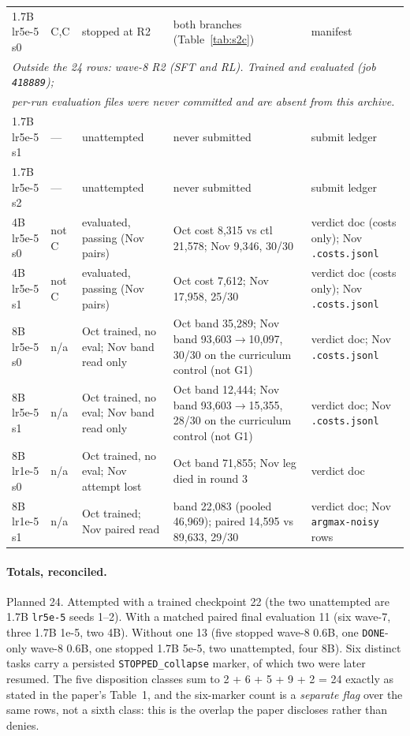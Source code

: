 \documentclass[11pt,a4paper]{article}
\begin{document}
\begin{table}[h]
\begin{tabular}{@{}p{2.35cm}p{2.0cm}p{2.6cm}p{3.5cm}p{3.2cm}@{}}
1.7B lr5e-5 s0 & C,C & stopped at R2 & both branches (Table~\ref{tab:s2c}) & manifest \\
\multicolumn{5}{l}{\emph{Outside the 24 rows: wave-8 R2 (SFT and RL). Trained and evaluated (job \texttt{418889});}} \\
\multicolumn{5}{l}{\emph{per-run evaluation files were never committed and are absent from this archive.}} \\
1.7B lr5e-5 s1 & --- & unattempted & never submitted & submit ledger \\
1.7B lr5e-5 s2 & --- & unattempted & never submitted & submit ledger \\
\midrule
4B lr5e-5 s0 & not C & evaluated, passing (Nov pairs) & Oct cost 8{,}315 vs ctl 21{,}578; Nov 9{,}346, 30/30 & verdict doc (costs only); Nov \texttt{.costs.jsonl} \\
4B lr5e-5 s1 & not C & evaluated, passing (Nov pairs) & Oct cost 7{,}612; Nov 17{,}958, 25/30 & verdict doc (costs only); Nov \texttt{.costs.jsonl} \\
\midrule
8B lr5e-5 s0 & n/a & Oct trained, no eval; Nov band read only & Oct band 35{,}289; Nov band 93{,}603$\to$10{,}097, 30/30 on the curriculum control (not G1) & verdict doc; Nov \texttt{.costs.jsonl} \\
8B lr5e-5 s1 & n/a & Oct trained, no eval; Nov band read only & Oct band 12{,}444; Nov band 93{,}603$\to$15{,}355, 28/30 on the curriculum control (not G1) & verdict doc; Nov \texttt{.costs.jsonl} \\
8B lr1e-5 s0 & n/a & Oct trained, no eval; Nov attempt lost & Oct band 71{,}855; Nov leg died in round 3 & verdict doc \\
8B lr1e-5 s1 & n/a & Oct trained; Nov paired read & band 22{,}083 (pooled 46{,}969); paired 14{,}595 vs 89{,}633, 29/30 & verdict doc; Nov \texttt{argmax-noisy} rows \\
\bottomrule
\end{tabular}
\end{table}

\paragraph{Totals, reconciled.} Planned 24. Attempted with a trained checkpoint 22 (the two
unattempted are 1.7B \texttt{lr5e-5} seeds 1--2). With a matched paired final evaluation 11 (six
wave-7, three 1.7B 1e-5, two 4B). Without one 13 (five stopped wave-8 0.6B, one \texttt{DONE}-only
wave-8 0.6B, one stopped 1.7B 5e-5, two unattempted, four 8B). Six distinct tasks carry a persisted
\texttt{STOPPED\_collapse} marker, of which two were later resumed. The five disposition classes sum
to 2 + 6 + 5 + 9 + 2 = 24 exactly as stated in the paper's Table~1, and the six-marker count is a
\emph{separate flag} over the same rows, not a sixth class: this is the overlap the paper discloses
rather than denies.
\end{document}
